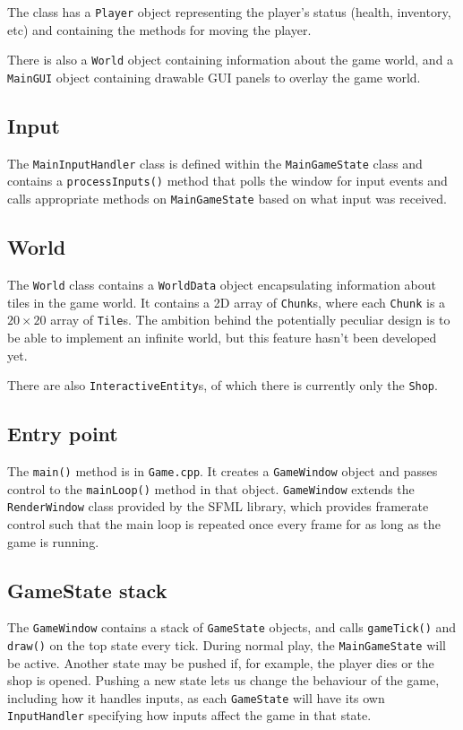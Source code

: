 \documentclass[10pt,twoside,a4paper]{article}
\begin{document}
The class has a \verb|Player| object representing the player's status (health, inventory, etc) and containing the methods for moving the player.

There is also a \verb|World| object containing information about the game world, and a \verb|MainGUI| object containing drawable GUI panels to overlay the game world.

\subsection*{Input}

The \verb|MainInputHandler| class is defined within the \verb|MainGameState| class and contains a \verb|processInputs()| method that polls the window for input events and calls appropriate methods on \verb|MainGameState| based on what input was received.

\subsection*{World}

The \verb|World| class contains a \verb|WorldData| object encapsulating information about tiles in the game world. 
It contains a 2D array of \verb|Chunk|s, where each \verb|Chunk| is a $20 \times 20$ array of \verb|Tile|s. 
The ambition behind the potentially peculiar design is to be able to implement an infinite world, but this feature hasn't been developed yet.

There are also \verb|InteractiveEntity|s, of which there is currently only the \verb|Shop|.

\subsection*{Entry point}

The \verb|main()| method is in \verb|Game.cpp|. 
It creates a \verb|GameWindow| object and passes control to the \verb|mainLoop()| method in that object. 
\verb|GameWindow| extends the \verb|RenderWindow| class provided by the SFML library, which provides framerate control such that the main loop is repeated once every frame for as long as the game is running.

\subsection*{GameState stack}

The \verb|GameWindow| contains a stack of \verb|GameState| objects, and calls \verb|gameTick()| and \verb|draw()| on the top state every tick. 
During normal play, the \verb|MainGameState| will be active. 
Another state may be pushed if, for example, the player dies or the shop is opened. 
Pushing a new state lets us change the behaviour of the game, including how it handles inputs, as each \verb|GameState| will have its own \verb|InputHandler| specifying how inputs affect the game in that state.
\end{document}
